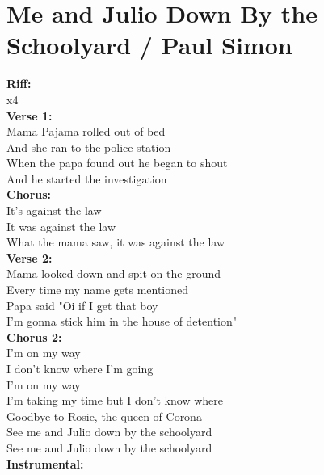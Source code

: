 \section{Me and Julio Down By the Schoolyard / Paul Simon}\label{sec:meandjulio}

\Amajor
\DmajorEasy
\EmajorEasy
\Bseven

\textbf{Riff:}\\
 x4\\
\textbf{Verse 1:}\\
 Mama Pajama rolled out of bed\\
And she ran to the police station\\
When the papa found out he began to shout\\
And he started the investigation \\
\textbf{Chorus:}\\
It's against the law\\
It was against the law\\
What the mama saw, it was against the law\\
\textbf{Verse 2:}\\
 Mama looked down and spit on the ground\\
Every time my name gets mentioned\\
Papa said "Oi if I get that boy\\
I'm gonna stick him in the house of detention"\\
\textbf{Chorus 2:}\\
I'm on my way\\
I don't know where I'm going\\
I'm on my way\\
I'm taking my time but I don't know where\\
Goodbye to Rosie, the queen of Corona\\
See me and Julio down by the schoolyard \\
See me and Julio down by the schoolyard \\
\textbf{Instrumental:}\\
